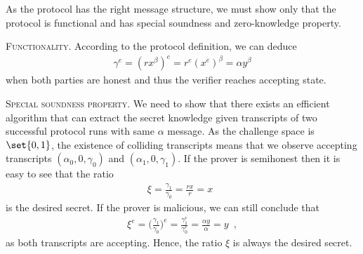 \documentclass{crypto-exercise}
\begin{document}
\begin{solution}
As the protocol has the right message structure, we must show only that the protocol is functional and has special soundness and zero-knowledge property. 


\vspace*{2ex}
\noindent
\textsc{Functionality.} 
According to the protocol definition, we can deduce 
\begin{align*}
\gamma^e=(rx^\beta)^e=r^e(x^e)^\beta=\alpha y^\beta
\end{align*}
when both parties are honest and thus the verifier reaches accepting state.

\vspace*{2ex}
\noindent
\textsc{Special soundness property.} 
We need to show that there exists an efficient algorithm that can extract the secret knowledge given transcripts of two successful protocol runs with same $\alpha$ message. As the challenge space is $\set{0,1}$, the existence of colliding transcripts means that we observe  accepting transcripts $(\alpha_0, 0, \gamma_0)$ and $(\alpha_1, 0, \gamma_1)$. If the prover is semihonest then it is easy to see that the ratio
\begin{align*}
\xi=\frac{\gamma_1}{\gamma_0}=\frac{rx}{r}=x\enspace
\end{align*}
is the desired secret. If the prover is malicious, we can still conclude that 
\begin{align*}
\xi^e=\biggl(\frac{\gamma_1}{\gamma_0}\biggr)^e=\frac{\gamma_1^e}{\gamma_0^e}=\frac{\alpha y}{\alpha}=y\enspace,
\end{align*}
as both transcripts are accepting. Hence, the ratio $\xi$ is always the desired secret.


\end{solution}
\end{document}

